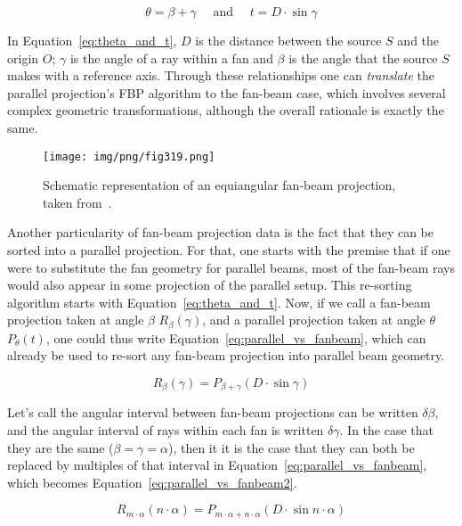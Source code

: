 \begin{equation}
    \label{eq:theta_and_t}
    \theta = \beta + \gamma \quad \text{ and } \quad t = D \cdot \sin \gamma
\end{equation}

In Equation~\ref{eq:theta_and_t}, $D$ is the distance between the source
$S$ and the origin $O$; $\gamma$ is the angle of a ray within a fan and
$\beta$ is the angle that the source $S$ makes with a reference axis.
Through these relationships one can \emph{translate} the parallel
projection's \gls{FBP} algorithm to the fan-beam case, which involves several
complex geometric transformations, although the overall rationale is
exactly the same.

\begin{figure}[htpb]
    \centering
    \texttt{[image: img/png/fig319.png]}
    \caption{Schematic representation of an equiangular fan-beam
    projection, taken from~\cite{Kak2001}.}
    \label{fig:equiangular}
\end{figure}

Another particularity of fan-beam projection data is the fact that they
can be sorted into a parallel projection. For that, one starts with the
premise that if one were to substitute the fan geometry for parallel
beams, most of the fan-beam rays would also appear in some projection of
the parallel setup. This re-sorting algorithm starts with
Equation~\ref{eq:theta_and_t}. Now, if we call a fan-beam projection
taken at angle $\beta$ $R_{\beta}(\gamma)$, and a parallel projection
taken at angle $\theta$ $P_{\theta}(t)$, one could thus write
Equation~\ref{eq:parallel_vs_fanbeam}, which can already be used to
re-sort any fan-beam projection into parallel beam geometry.

\begin{equation}
    \label{eq:parallel_vs_fanbeam}
    R_{\beta}(\gamma) = P_{\beta + \gamma}(D \cdot \sin \gamma)
\end{equation}

Let's call the angular interval between fan-beam projections can be
written $\delta\beta$, and the angular interval of rays within each fan
is written $\delta\gamma$. In the case that they are the same
($\beta=\gamma=\alpha$), then it it is the case that they can both be
replaced by multiples of that interval in
Equation~\ref{eq:parallel_vs_fanbeam}, which becomes
Equation~\ref{eq:parallel_vs_fanbeam2}.

\begin{equation}
    \label{eq:parallel_vs_fanbeam2}
    R_{m \cdot \alpha}(n \cdot\alpha) = P_{m \cdot\alpha + n
    \cdot\alpha}(D \cdot \sin n \cdot\alpha)
\end{equation}

